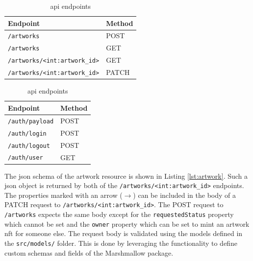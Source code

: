 \begin{table}[h]
    \begin{subtable}{0.45\textwidth}
        \centering
        \begin{tabular}{ll}
            \textbf{Endpoint}                       & \textbf{Method} \\ \hline
            \texttt{/artworks}                   & POST                 \\
            \texttt{/artworks}                   & GET                  \\
            \texttt{/artworks/<int:artwork\_id>} & GET                  \\
            \texttt{/artworks/<int:artwork\_id>} & PATCH
        \end{tabular}
        \caption{Resource endpoints}
        \label{tab:resource_endpoints}
    \end{subtable}
    \hfill
    \begin{subtable}{0.45\textwidth}
        \centering
        \begin{tabular}{ll}
            \textbf{Endpoint}                       & \textbf{Method} \\ \hline
            \texttt{/auth/payload}               & POST                \\
            \texttt{/auth/login}                 & POST                 \\
            \texttt{/auth/logout}                & POST                  \\
            \texttt{/auth/user}                  & GET 
        \end{tabular}
        \caption{Authentication endpoints}
        \label{tab:authentication_endpoints}
    \end{subtable}
\caption{\gls{api} endpoints}
\end{table}

The \gls{json} schema of the artwork resource is shown in Listing \ref{lst:artwork}. Such a \gls{json} object is returned by both of the \texttt{/artworks/<int:artwork\_id>} endpoints. The properties marked with an arrow ($\rightarrow$) can be included in the body of a PATCH request to \texttt{/artworks/<int:artwork\_id>}. The POST request to \texttt{/artworks} expects the same body except for the \texttt{requestedStatus} property which cannot be set and the \texttt{owner} property which can be set to mint an artwork \gls{nft} for someone else. The request body is validated using the models defined in the \texttt{src/models/} folder. This is done by leveraging the functionality to define custom schemas and fields of the Marshmallow \cite{marshmallow} package.

